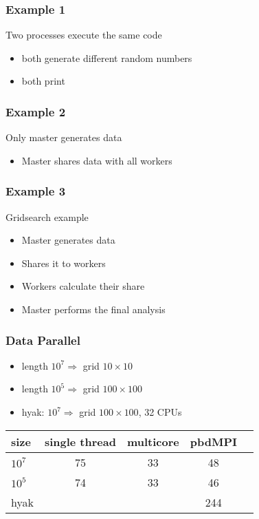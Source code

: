 \documentclass[pdftex]{beamer}
\begin{document}
\begin{frame}
  \frametitle{Example 1}
  Two processes execute the same code
  \begin{itemize}
  \item both generate different random numbers
  \item both print
  \end{itemize}
\end{frame}

\begin{frame}
  \frametitle{Example 2}
  Only master generates data
  \begin{itemize}
  \item Master shares data with all workers
  \end{itemize}
\end{frame}

\begin{frame}
  \frametitle{Example 3}
  Gridsearch example
  \begin{itemize}
  \item Master generates data
  \item Shares it to workers
  \item Workers calculate their share
  \item Master performs the final analysis
  \end{itemize}
\end{frame}

\begin{frame}
  \frametitle{Data Parallel}
  \begin{itemize}
  \item length $10^{7} \Rightarrow$ grid $10\times10$
  \item length $10^{5} \Rightarrow$ grid $100\times100$
  \item hyak:  $10^{7} \Rightarrow$ grid $100\times100$, 32 CPUs
  \end{itemize}
  \begin{tabular}{l cccc}
    \toprule
    size      & single thread & multicore & pbdMPI\\
    \midrule
    $10^{7}$  & 75            & 33        & 48     \\
    $10^{5}$  & 74            & 33        & 46    \\
    hyak      &               &           & 244 \\
    \bottomrule
  \end{tabular}
\end{frame}
\end{document}
